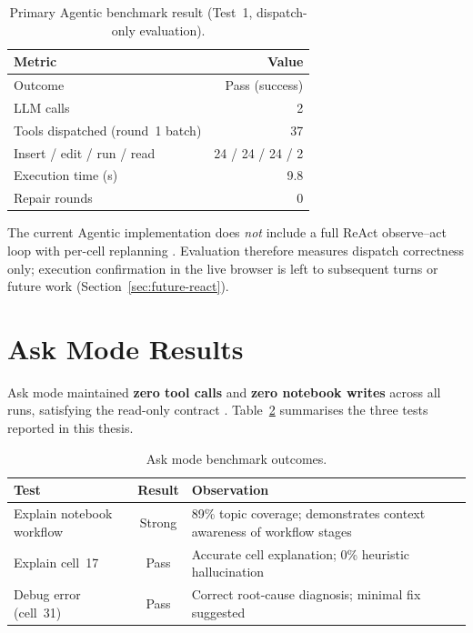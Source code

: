 \begin{table}[!ht]
\centering
\caption{Primary Agentic benchmark result (Test~1, dispatch-only evaluation).}
\label{tab:agentic-primary}
\small
\begin{tabular}{|l|r|}
\hline
\textbf{Metric} & \textbf{Value} \\ \hline
Outcome & Pass (success) \\
LLM calls & 2 \\
Tools dispatched (round~1 batch) & 37 \\
Insert / edit / run / read & 24 / 24 / 24 / 2 \\
Execution time (s) & 9.8 \\
Repair rounds & 0 \\ \hline
\end{tabular}
\end{table}

The current Agentic implementation does \emph{not} include a full ReAct observe--act loop with per-cell replanning \parencite{yao2023react,shinn2023reflexion}. Evaluation therefore measures dispatch correctness only; execution confirmation in the live browser is left to subsequent turns or future work (Section~\ref{sec:future-react}).

\section{Ask Mode Results}

Ask mode maintained \textbf{zero tool calls} and \textbf{zero notebook writes} across all runs, satisfying the read-only contract \parencite{vaithilingam2022expectation}. Table~\ref{tab:ask-results} summarises the three tests reported in this thesis.

\begin{table}[!ht]
\centering
\caption{Ask mode benchmark outcomes.}
\label{tab:ask-results}
\small
\begin{tabular}{|p{3.8cm}|c|p{5.8cm}|}
\hline
\textbf{Test} & \textbf{Result} & \textbf{Observation} \\ \hline
Explain notebook workflow & Strong & 89\% topic coverage; demonstrates context awareness of workflow stages \\
Explain cell~17 & Pass & Accurate cell explanation; 0\% heuristic hallucination \\
Debug error (cell~31) & Pass & Correct root-cause diagnosis; minimal fix suggested \\ \hline
\end{tabular}
\end{table}

